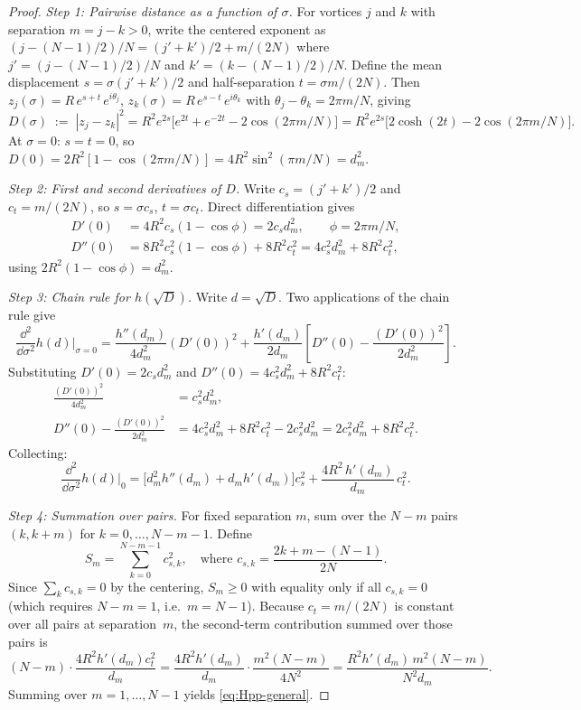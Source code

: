 \begin{proof}
\emph{Step 1: Pairwise distance as a function of $\sigma$.}
For vortices $j$ and $k$ with separation $m = j - k > 0$, write
the centered exponent as $(j - (N{-}1)/2)/N = (j' + k')/2 + m/(2N)$
where $j' = (j-(N{-}1)/2)/N$ and $k' = (k-(N{-}1)/2)/N$.
Define the mean displacement $s = \sigma(j'+k')/2$ and half-separation
$t = \sigma m/(2N)$.  Then $z_j(\sigma) = R\,e^{s+t}\,e^{i\theta_j}$,
$z_k(\sigma) = R\,e^{s-t}\,e^{i\theta_k}$ with
$\theta_j - \theta_k = 2\pi m/N$, giving
\[
  D(\sigma) \;{:=}\; |z_j - z_k|^2
  = R^2 e^{2s}\bigl[e^{2t} + e^{-2t} - 2\cos(2\pi m/N)\bigr]
  = R^2 e^{2s}\bigl[2\cosh(2t) - 2\cos(2\pi m/N)\bigr].
\]
At $\sigma = 0$: $s = t = 0$, so
$D(0) = 2R^2[1 - \cos(2\pi m/N)] = 4R^2\sin^2(\pi m/N) = d_m^2$.

\emph{Step 2: First and second derivatives of $D$.}
Write $c_s = (j'+k')/2$ and $c_t = m/(2N)$, so
$s = \sigma c_s$, $t = \sigma c_t$.  Direct differentiation gives
\begin{align*}
  D'(0) &= 4R^2 c_s(1 - \cos\phi) = 2c_s d_m^2,
    \qquad \phi = 2\pi m/N, \\[3pt]
  D''(0) &= 8R^2 c_s^2(1 - \cos\phi) + 8R^2 c_t^2
    = 4c_s^2 d_m^2 + 8R^2 c_t^2,
\end{align*}
using $2R^2(1-\cos\phi) = d_m^2$.

\emph{Step 3: Chain rule for $h(\sqrt{D})$.}
Write $d = \sqrt{D}$.  Two applications of the chain rule give
\[
  \frac{\dd^2}{\dd\sigma^2}h(d)\bigg|_{\sigma=0}
  = \frac{h''(d_m)}{4d_m^2}(D'(0))^2
  + \frac{h'(d_m)}{2d_m}\!\left[D''(0) - \frac{(D'(0))^2}{2d_m^2}\right].
\]
Substituting $D'(0) = 2c_s d_m^2$ and
$D''(0) = 4c_s^2 d_m^2 + 8R^2 c_t^2$:
\begin{align*}
  \frac{(D'(0))^2}{4d_m^2} &= c_s^2 d_m^2, \\
  D''(0) - \frac{(D'(0))^2}{2d_m^2}
    &= 4c_s^2 d_m^2 + 8R^2 c_t^2 - 2c_s^2 d_m^2
    = 2c_s^2 d_m^2 + 8R^2 c_t^2.
\end{align*}
Collecting:
\[
  \frac{\dd^2}{\dd\sigma^2}h(d)\bigg|_0
  = \bigl[d_m^2 h''(d_m) + d_m h'(d_m)\bigr] c_s^2
  + \frac{4R^2\,h'(d_m)}{d_m}\,c_t^2.
\]

\emph{Step 4: Summation over pairs.}
For fixed separation $m$, sum over the $N-m$ pairs
$(k, k{+}m)$ for $k = 0, \ldots, N{-}m{-}1$.  Define
\[
  S_m = \sum_{k=0}^{N-m-1} c_{s,k}^2, \quad
  \text{where } c_{s,k} = \frac{2k + m - (N{-}1)}{2N}.
\]
Since $\sum_k c_{s,k} = 0$ by the centering, $S_m \ge 0$ with equality
only if all $c_{s,k} = 0$ (which requires $N - m = 1$, i.e.\ $m = N-1$).
Because $c_t = m/(2N)$ is constant over all pairs at separation~$m$,
the second-term contribution summed over those pairs is
\[
  (N{-}m)\cdot \frac{4R^2 h'(d_m) c_t^2}{d_m}
  = \frac{4R^2 h'(d_m)}{d_m}\cdot\frac{m^2(N{-}m)}{4N^2}
  = \frac{R^2 h'(d_m)\, m^2(N{-}m)}{N^2 d_m}.
\]
Summing over $m = 1, \ldots, N-1$
yields \eqref{eq:Hpp-general}.


\end{proof}
